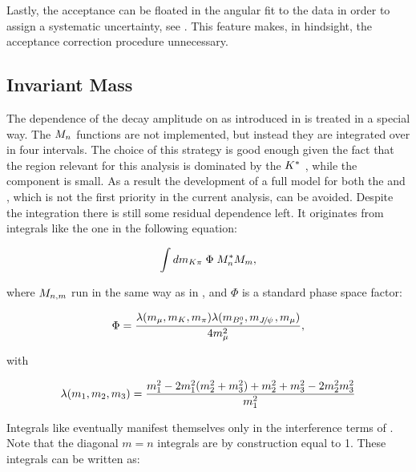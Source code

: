 Lastly, the acceptance can be floated in the angular fit to the data in order to assign a systematic uncertainty, see .
This feature makes, in hindsight, the acceptance correction procedure unnecessary.


\subsection{\Kpi Invariant Mass}
\label{Kpi_Invariant_mass}

The dependence of the \BJpsiKpi decay amplitude on \mkpi as introduced in  is treated in a special way.
The $\mKpiAmp$ functions are not implemented, but instead they are integrated over in four intervals. The choice of this strategy
is good enough given the fact that the \mkpi region relevant for this analysis is dominated by the $\Kstar$ \pwave,
while the \swave component is small. As a result the development of a full model for both the \pwave and \swave, which is not the
first priority in the current analysis, can be avoided. Despite the \mkpi integration there is still some residual dependence left.
It originates from integrals like the one in the following equation:

\begin{equation}
  \label{spIntegrals}
  \int d\mkpi \; \Phi \; \mKpiAmp^* \mKpiAmp[m],
\end{equation}

\noindent where $\mKpiAmp[n,m]$ run in the same way as in , and $\Phi$ is a standard
phase space factor:

\begin{equation}
  \centering
  \Phi = \frac{\lambda(m_\mmu,m_\kaon,m_\pion) \lambda(m_{\Bs},m_\jpsi,m_\mmu)}{ 4 m_\mmu^2},
  \label{csp_ph_sp_factor}
\end{equation}

\noindent with

\begin{equation}
  \centering
  \lambda(m_1,m_2,m_3) = \frac{m_1^2 - 2m_1^2(m_2^2 + m_3^2) + m_2^2 + m_3^2 - 2m_2^2m_3^2 } {m_1^2} \nonumber
  \label{csp_ph_sp_factor_def}
\end{equation}

Integrals like  eventually manifest themselves only in the \spwave interference
terms of . Note that the diagonal $m=n$ integrals are by construction equal to 1.
These integrals can be written as:

